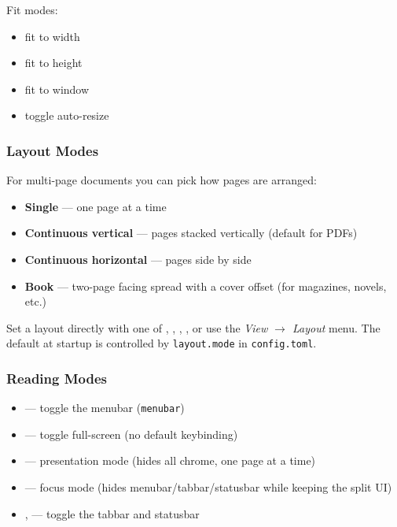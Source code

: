 \documentclass[a4paper,12pt]{article}
\begin{document}
Fit modes:
\begin{itemize}[leftmargin=*]
    \item {} fit to width
    \item {} fit to height
    \item {} fit to window
    \item {} toggle auto-resize
\end{itemize}

\subsubsection{Layout Modes}

For multi-page documents you can pick how pages are arranged:
\begin{itemize}[leftmargin=*]
    \item \textbf{Single} — one page at a time
    \item \textbf{Continuous vertical} — pages stacked vertically (default for PDFs)
    \item \textbf{Continuous horizontal} — pages side by side
    \item \textbf{Book} — two-page facing spread with a cover offset (for magazines, novels, etc.)
\end{itemize}

Set a layout directly with one of , , , , or use the \textit{View $\to$ Layout} menu. The default at startup is controlled by \texttt{layout.mode} in \texttt{config.toml}.

\subsubsection{Reading Modes}
\begin{itemize}[leftmargin=*]
    \item {} — toggle the menubar (\texttt{menubar})
    \item {} — toggle full-screen (no default keybinding)
    \item {} — presentation mode (hides all chrome, one page at a time)
    \item {} — focus mode (hides menubar/tabbar/statusbar while keeping the split UI)
    \item {},  — toggle the tabbar and statusbar
\end{itemize}
\end{document}
